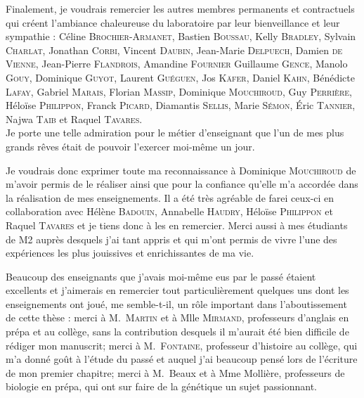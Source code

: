Finalement, je voudrais remercier les autres membres permanents et contractuels qui créent l'ambiance chaleureuse du laboratoire par leur bienveillance et leur sympathie : 
Céline \textsc{Brochier-Armanet},
Bastien \textsc{Boussau},
Kelly \textsc{Bradley},
Sylvain \textsc{Charlat},
Jonathan \textsc{Corbi},
Vincent \textsc{Daubin},
Jean-Marie \textsc{Delpuech},
Damien \textsc{de Vienne},
Jean-Pierre \textsc{Flandrois},
Amandine \textsc{Fournier}
Guillaume \textsc{Gence},
Manolo \textsc{Gouy},
Dominique \textsc{Guyot},
Laurent \textsc{Guéguen},
Jos \textsc{Käfer},
Daniel \textsc{Kahn},
Bénédicte \textsc{Lafay},
Gabriel \textsc{Marais},
Florian \textsc{Massip},
Dominique \textsc{Mouchiroud},
Guy \textsc{Perrière},
Héloïse \textsc{Philippon},
Franck \textsc{Picard},
Diamantis \textsc{Sellis},
Marie \textsc{Sémon},
\'Eric \textsc{Tannier},
Najwa \textsc{Taib} et
Raquel \textsc{Tavares}.\\




%




Je porte une telle admiration pour le métier d'enseignant que l'un de mes plus grands rêves était de pouvoir l'exercer moi-même un jour.

Je voudrais donc exprimer toute ma reconnaissance à Dominique \textsc{Mouchiroud} de m'avoir permis de le réaliser ainsi que pour la confiance qu'elle m'a accordée dans la réalisation de mes enseignements.
Il a été très agréable de farei ceux-ci en collaboration avec Hélène \textsc{Badouin}, Annabelle \textsc{Haudry}, Héloïse \textsc{Philippon} et Raquel \textsc{Tavares} et je tiens donc à les en remercier.
Merci aussi à mes étudiants de M2 auprès desquels j'ai tant appris et qui m'ont permis de vivre l'une des expériences les plus jouissives et enrichissantes de ma vie.

Beaucoup des enseignants que j'avais moi-même eus par le passé étaient excellents et j'aimerais en remercier tout particulièrement quelques uns dont les enseignements ont joué, me semble-t-il, un rôle important dans l'aboutissement de cette thèse : 
merci à M.\ \textsc{Martin} et à Mlle \textsc{Mirmand}, professeurs d'anglais en prépa et au collège, sans la contribution desquels il m'aurait été bien difficile de rédiger mon manuscrit; 
merci à M.\ \textsc{Fontaine}, professeur d'histoire au collège, qui m'a donné goût à l'étude du passé et auquel j'ai beaucoup pensé lors de l'écriture de mon premier chapitre; 
merci à M.\ Beaux et à Mme Mollière, professeurs de biologie en prépa, qui ont sur faire de la génétique un sujet passionnant.

